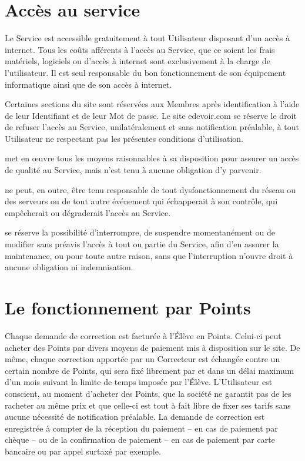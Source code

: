 \section{Accès au service}

Le Service est accessible gratuitement à tout Utilisateur disposant d'un accès à internet. Tous les coûts afférents à l'accès au Service, que ce soient les frais matériels, logiciels ou d'accès à internet sont exclusivement à la charge de l'utilisateur. Il est seul responsable du bon fonctionnement de son équipement informatique ainsi que de son accès à internet.

Certaines sections du site sont réservées aux Membres après identification à l'aide de leur Identifiant et de leur Mot de passe.
Le site edevoir.com se réserve le droit de refuser l'accès au Service, unilatéralement et sans notification préalable, à tout Utilisateur ne respectant pas les présentes conditions d'utilisation.

\eDevoir met en œuvre tous les moyens raisonnables à sa disposition pour assurer un accès de qualité au Service, mais n'est tenu à aucune obligation d'y parvenir.

\eDevoir ne peut, en outre, être tenu responsable de tout dysfonctionnement du réseau ou des serveurs ou de tout autre événement qui échapperait à son contrôle, qui empêcherait ou dégraderait l'accès au Service.

\eDevoir se réserve la possibilité d'interrompre, de suspendre momentanément ou de modifier sans préavis l'accès à tout ou partie du Service, afin d'en assurer la maintenance, ou pour toute autre raison, sans que l'interruption n'ouvre droit à aucune obligation ni indemnisation.


\section{Le fonctionnement par Points}

Chaque demande de correction est facturée à l'Élève en Points. Celui-ci peut acheter des Points par divers moyens de paiement mis à disposition sur le site. De même, chaque correction apportée par un Correcteur est échangée contre un certain nombre de Points, qui sera fixé librement par \eDevoir et dans un délai maximum d'un mois suivant la limite de temps imposée par l'Élève. L'Utilisateur est conscient, au moment d'acheter des Points, que la société \eDevoir ne garantit pas de les racheter au même prix et que celle-ci est tout à fait libre de fixer ses tarifs sans aucune nécessité de notification préalable.
La demande de correction est enregistrée à compter de la réception du paiement -- en cas de paiement par chèque -- ou de la confirmation de paiement -- en cas de paiement par carte bancaire ou par appel surtaxé par exemple.

